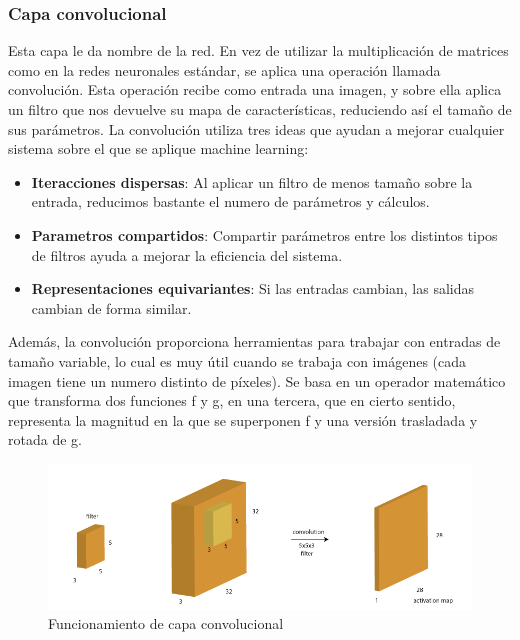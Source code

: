 \subsubsection{Capa convolucional}
Esta capa le da nombre de la red. En vez de utilizar la multiplicación de matrices como en la redes neuronales estándar, se aplica una operación llamada convolución. Esta operación recibe como entrada una imagen, y sobre ella aplica un filtro que nos devuelve su mapa de características, reduciendo así el tamaño de sus parámetros. La convolución utiliza tres ideas que ayudan a mejorar cualquier sistema sobre el que se aplique machine learning:
\begin{itemize}
\item{\textbf{Iteracciones dispersas}:}
Al aplicar un filtro de menos tamaño sobre la entrada, reducimos bastante el numero de parámetros y cálculos.
\item{\textbf{Parametros compartidos}:}
Compartir parámetros entre los distintos tipos de filtros ayuda a mejorar la eficiencia del sistema.
\item{\textbf{Representaciones equivariantes}:}
Si las entradas cambian, las salidas cambian de forma similar.
\end{itemize}
Además, la convolución proporciona herramientas para trabajar con entradas de tamaño variable, lo cual es muy útil cuando se trabaja con imágenes (cada imagen tiene un numero distinto de píxeles). Se basa en un operador matemático que transforma dos funciones f y g, en una tercera, que en cierto sentido, representa la magnitud en la que se superponen f y una versión trasladada y rotada de g.
\begin{figure}[htp]
\centering
\includegraphics[scale=0.7]{images/conv_layer.png}
\caption{Funcionamiento de capa convolucional}
\end{figure}\\
